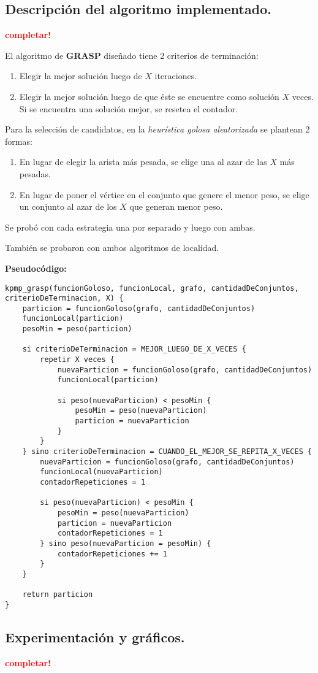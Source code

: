 \subsection{Descripción del algoritmo implementado.}
\vspace*{0.3cm}
\textcolor{red}{\textbf{completar!}}

El algoritmo de \textbf{GRASP} diseñado tiene 2 criterios de terminación:
\begin{enumerate}
\item Elegir la mejor solución luego de $X$ iteraciones.

\item Elegir la mejor solución luego de que éste se encuentre como solución $X$ veces. Si se encuentra una solución mejor, se resetea el contador.
\end{enumerate}

Para la selección de candidatos, en la \textit{heurística golosa aleatorizada} se plantean 2 formas:
\begin{enumerate}
\item En lugar de elegir la arista más pesada, se elige una al azar de las $X$ más pesadas.

\item En lugar de poner el vértice en el conjunto que genere el menor peso, se elige un conjunto al azar de los $X$ que generan menor peso.
\end{enumerate}

Se probó con cada estrategia una por separado y luego con ambas.

También se probaron con ambos algoritmos de localidad.

\vspace*{0.5cm}

\textbf{Pseudocódigo:}

\vspace*{0.3cm}

\begin{verbatim}
kpmp_grasp(funcionGoloso, funcionLocal, grafo, cantidadDeConjuntos, criterioDeTerminacion, X) {
    particion = funcionGoloso(grafo, cantidadDeConjuntos)
    funcionLocal(particion)
    pesoMin = peso(particion)

    si criterioDeTerminacion = MEJOR_LUEGO_DE_X_VECES {
        repetir X veces {
            nuevaParticion = funcionGoloso(grafo, cantidadDeConjuntos)
            funcionLocal(particion)

            si peso(nuevaParticion) < pesoMin {
                pesoMin = peso(nuevaParticion)
                particion = nuevaParticion
            }
        }
    } sino criterioDeTerminacion = CUANDO_EL_MEJOR_SE_REPITA_X_VECES {
        nuevaParticion = funcionGoloso(grafo, cantidadDeConjuntos)
        funcionLocal(nuevaParticion)
        contadorRepeticiones = 1

        si peso(nuevaParticion) < pesoMin {
            pesoMin = peso(nuevaParticion)
            particion = nuevaParticion
            contadorRepeticiones = 1
        } sino peso(nuevaParticion = pesoMin) {
            contadorRepeticiones += 1
        }
    }

    return particion
}
\end{verbatim}



\newpage
\subsection{Experimentación y gráficos.}
\vspace*{0.3cm}
\textcolor{red}{\textbf{completar!}}
